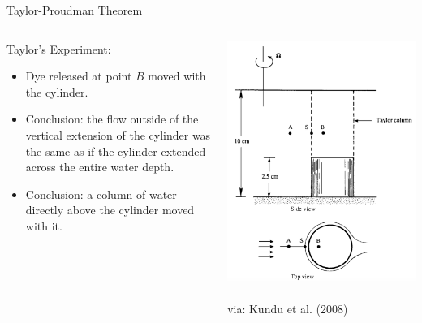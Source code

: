 \begin{frame}{Taylor-Proudman Theorem}
\setlength{\fboxsep}{0pt}
\setlength{\fboxrule}{1pt}
\begin{columns}[T]
    \begin{column}{.5\textwidth}
    	Taylor's Experiment:
    	\begin{itemize}
    		\item Dye released at point $B$ moved with the  cylinder.
    		\item Conclusion: the flow outside of the vertical extension of the cylinder was the same as if the cylinder extended across the entire water depth.
    		\item Conclusion: a column of water directly above the cylinder moved with it. 
    	\end{itemize}	
    \end{column}
    \begin{column}{.5\textwidth}
    	\begin{minipage}[c][.65\textheight][c]{\linewidth}
    		\includegraphics[width=\textwidth]{tp1}
    		\centering \tiny{~\\via: Kundu et al. (2008)}
    	\end{minipage}
    \end{column}
  \end{columns}
\end{frame}
